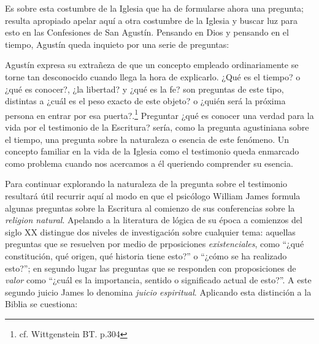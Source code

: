Es sobre esta costumbre de la Iglesia que ha de formularse ahora una pregunta;
resulta apropiado apelar aquí a otra costumbre de la Iglesia y buscar luz para
esto en las Confesiones de San Agustín. Pensando en Dios y pensando en el
tiempo, Agustín queda inquieto por una serie de preguntas: 

Agustín expresa su extrañeza de que un concepto empleado ordinariamente se torne
tan desconocido cuando llega la hora de explicarlo. ¿Qué es el tiempo? o ¿qué es
conocer?, ¿la libertad? y ¿qué es la fe? son preguntas de este tipo, distintas a
¿cuál es el peso exacto de este objeto? o ¿quién será la próxima persona en
entrar por esa puerta?.\footnote{cf. Wittgenstein BT. p.304} Preguntar ¿qué es
conocer una verdad para la vida por el testimonio de la Escritura? sería, como
la pregunta agustiniana sobre el tiempo, una pregunta sobre la naturaleza o
esencia de este fenómeno. Un concepto familiar en la vida de la Iglesia como el
testimonio queda enmarcado como problema cuando nos acercamos a él queriendo
comprender su esencia.

Para continuar explorando la naturaleza de la pregunta sobre el testimonio
resultará útil recurrir aquí al modo en que el psicólogo William James formula
algunas preguntas sobre la Escritura al comienzo de sus conferencias sobre la
\emph{religion natural}. Apelando a la literatura de lógica de su época a
comienzos del siglo XX distingue dos niveles de investigación sobre cualquier
tema: aquellas preguntas que se resuelven por medio de prposiciones
\emph{existenciales}, como ``¿qué constitución, qué origen, qué historia tiene
esto?'' o ``¿cómo se ha realizado esto?''; en segundo lugar las preguntas que se
responden con proposiciones de \emph{valor} como ``¿cuál es la importancia,
sentido o significado actual de esto?''. A este segundo juicio James lo denomina
\emph{juicio espiritual}. Aplicando esta distinción a la Biblia se cuestiona:

